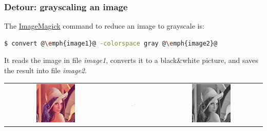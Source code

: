 \documentclass[english,serif,mathserif,xcolor=pdftex,dvipsnames,table]{beamer}
\begin{document}
\begin{frame}[fragile]
  \frametitle{Detour: grayscaling an image}
  The \href{http://www.imagemagick.org}{ImageMagick}
  command to reduce an image to grayscale is:
  \begin{lstlisting}[language=sh]
    $ convert @\emph{image1}@ -colorspace gray @\emph{image2}@
  \end{lstlisting}%

  \+
  It reads the image in file \emph{image1}, converts it to a
  black\&white picture, and saves the result into file \emph{image2}.

  \+
  \begin{tabular}[c]{ccc}
    \includegraphics[width=0.4\textwidth]{fig/lena}
    &
    \includegraphics[width=0.1\textwidth]{fig/arrow}
    &
    \includegraphics[width=0.4\textwidth]{fig/lena_gray}
  \end{tabular}
\end{frame}
\end{document}
